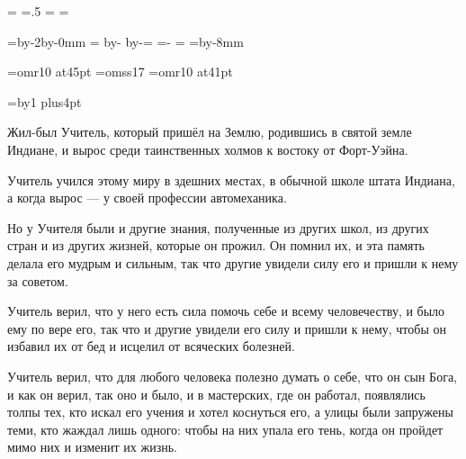 \pdfpagewidth=297mm
\pdfpageheight=210mm
\pdfhorigin=1in
\pdfvorigin=0pt

\shhtotal=\pdfpagewidth
\htotal=.5\shhtotal
\vtotal=\pdfpageheight
\shoutline=0pt
\shstaplewidth=0pt
\shcrop=0pt
\shfootline={}
\shthickness=0pt %

\horigin=4.5mm %
\hsize=\htotal \advance\hsize by-2\horigin \advance\hsize by-0mm %
=\htotal \advance{} by-\hsize \advance{} by-\horigin \horigin=
\hoffset=\htotal \advance\hoffset-\hsize \advance{}\horigin
\output={\ifodd\pageno\hoffset=0pt\fi \plainoutput}
\vorigin=2.5mm
\vsize=\vtotal \advance\vsize by-8mm

\font\chapfont=omr10 at45pt
\font\handfont=omss17
\font\bukvfont=omr10 at41pt

\nopagenumbers

{}
\vskip3cm

\begingroup
\baselineskip=17pt
\newcount\n
\everypar={\advance\n by1 \hang}
\parskip=30pt plus4pt
\handfont

Жил-был Учитель, который пришёл на Землю, родившись в святой земле Индиане, и вырос среди таинственных холмов к востоку от Форт-Уэйна.

Учитель учился этому миру в здешних местах, в обычной школе штата Индиана, а когда вырос --- у своей профессии автомеханика.

Но у Учителя были и другие знания, полученные из других школ, из других стран и из других жизней, которые он прожил. Он помнил их, и эта память делала его мудрым и сильным, так что другие увидели силу его и пришли к нему за советом.

Учитель верил, что у него есть сила помочь себе и всему человечеству, и было ему по вере его, так что и другие увидели его силу и пришли к нему, чтобы он избавил их от бед и исцелил от всяческих болезней.

Учитель верил, что для любого человека полезно думать о себе, что он сын Бога, и как он верил, так оно и было, и в мастерских, где он работал, появлялись толпы тех, кто искал его учения и хотел коснуться его, а улицы были запружены теми, кто жаждал лишь одного: чтобы на них упала его тень, когда он пройдет мимо них и изменит их жизнь.

